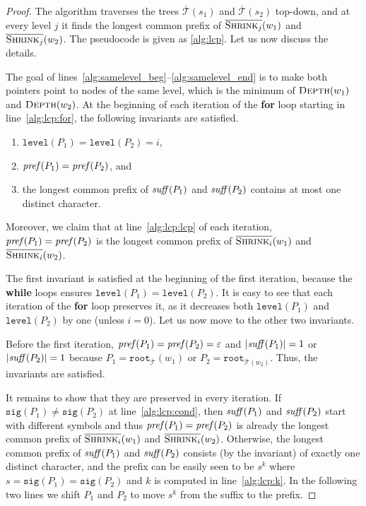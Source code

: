\documentclass[a4paper]{article}
\theoremstyle{remark}
\newcommand{\depth}{\textsc{Depth}}
\newcommand{\cshrink}[1]{\ensuremath{\overline{\textsc{Shrink}_{#1}}}}
\newcommand{\str}{w}
\newcommand{\ustree}{\mathcal{\overline{T}}}
\newcommand{\itroot}{\mathtt{root}}
\newcommand{\itlevel}{\mathtt{level}}
\newcommand{\itsig}{\mathtt{sig}}
\newcommand{\algptr}{P}
\newcommand{\eps}{\varepsilon}
\begin{document}
\begin{proof}
The algorithm traverses the trees $\ustree(s_1)$ and $\ustree(s_2)$ top-down, and at every level $j$ it finds the longest common prefix of $\cshrink{j}(\str_1)$ and $\cshrink{j}(\str_2)$.
The pseudocode is given as \cref{alg:lcp}.
Let us now discuss the details.

The goal of lines~\ref{alg:samelevel_beg}--\ref{alg:samelevel_end} is to make both pointers point to nodes of the same level,
which is the minimum of $\depth(w_1)$ and $\depth(w_2)$.
At the beginning of each iteration of the \textbf{for} loop starting in line~\ref{alg:lcp:for}, the following invariants are satisfied.
\begin{enumerate}
  \item $\itlevel(P_1)=\itlevel(P_2)=i$,
  \item $\mathit{pref}(P_1)=\mathit{pref}(P_2)$, and
  \item the longest common prefix of $\mathit{suff}(P_1)$ and $\mathit{suff}(P_2)$ contains at most one distinct character.
\end{enumerate}
Moreover, we claim that at line~\ref{alg:lcp:lcp} of each iteration, $\mathit{pref}(P_1)=\mathit{pref}(P_2)$
is the longest common prefix of $\cshrink{i}(w_1)$ and $\cshrink{i}(w_2)$.



The first invariant is satisfied at the beginning of the first iteration, because the \textbf{while} loops ensures $\itlevel(\algptr_1) = \itlevel(\algptr_2)$. It is easy to see that each iteration of the \textbf{for} loop preserves it, as it decreases both $\itlevel(\algptr_1)$ and $\itlevel(\algptr_2)$ by one (unless $i=0$).
Let us now move to the other two invariants.

Before the first iteration, $\itstring(\algptr_1)=\itstring(\algptr_2)=\eps$ and $|\mathit{suff}(P_1)|=1$ or $|\mathit{suff}(P_2)|=1$
because $P_1=\itroot_{\ustree}(w_1)$ or $P_2=\itroot_{\ustree(w_2)}$.
Thus, the invariants are satisfied.

It remains to show that they are preserved in every iteration.
If $\itsig(P_1)\ne \itsig(P_2)$ at line~\ref{alg:lcp:cond}, then $\mathit{suff}(P_1)$ and $\mathit{suff}(P_2)$
start with different symbols and thus $\mathit{pref}(P_1)=\mathit{pref}(P_2)$ is already the longest
common prefix of $\cshrink{i}(w_1)$ and $\cshrink{i}(w_2)$.
Otherwise, the longest common prefix of $\mathit{suff}(P_1)$ and $\mathit{suff}(P_2)$ consists (by the invariant) of exactly
one distinct character, and the prefix can be easily seen to be $s^k$
where $s=\itsig(P_1)=\itsig(P_2)$ and $k$ is computed in line~\ref{alg:lcp:k}.
In the following two lines we shift $P_1$ and $P_2$ to move $s^k$ from the suffix to the prefix.


\end{proof}
\end{document}
